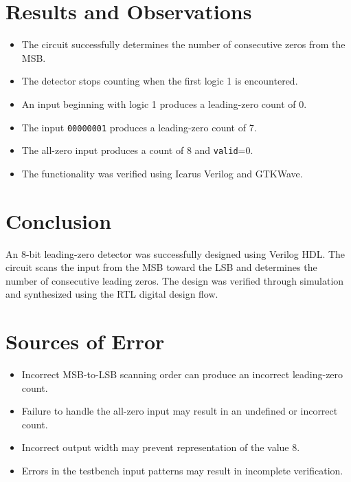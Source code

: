 \documentclass[12pt,a4paper]{report}
\begin{document}
\vspace{0.5cm}

\section{Results and Observations}

\begin{itemize}
    \item The circuit successfully determines the number of consecutive zeros from the MSB.
    \item The detector stops counting when the first logic 1 is encountered.
    \item An input beginning with logic 1 produces a leading-zero count of 0.
    \item The input \texttt{00000001} produces a leading-zero count of 7.
    \item The all-zero input produces a count of 8 and \texttt{valid}=0.
    \item The functionality was verified using Icarus Verilog and GTKWave.
\end{itemize}

\section{Conclusion}

An 8-bit leading-zero detector was successfully designed using Verilog HDL. The circuit scans the input from the MSB toward the LSB and determines the number of consecutive leading zeros. The design was verified through simulation and synthesized using the RTL digital design flow.

\section{Sources of Error}

\begin{itemize}
    \item Incorrect MSB-to-LSB scanning order can produce an incorrect leading-zero count.
    \item Failure to handle the all-zero input may result in an undefined or incorrect count.
    \item Incorrect output width may prevent representation of the value 8.
    \item Errors in the testbench input patterns may result in incomplete verification.
\end{itemize}
\end{document}
